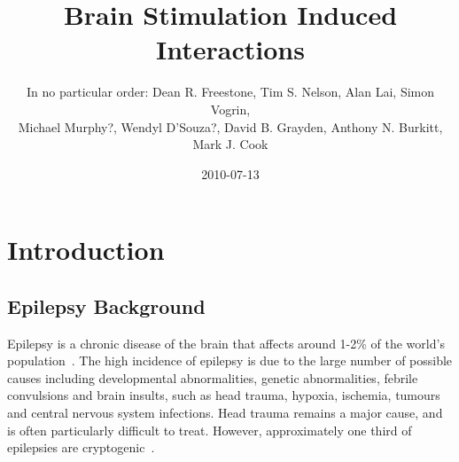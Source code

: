 \documentclass[]{article}
\title{Brain Stimulation Induced Interactions}
\author{In no particular order: Dean R. Freestone, Tim S. Nelson, Alan Lai, Simon Vogrin,\\
 Michael Murphy?, Wendyl D'Souza?, David B. Grayden, Anthony N. Burkitt, Mark J. Cook}
\date{2010-07-13}
\begin{document}
\ifpdf
{}
\else
{}
\fi

\maketitle


\begin{abstract}
\end{abstract}

\section{Introduction}
% 
% 

\subsection{Epilepsy Background}
Epilepsy is a chronic disease of the brain that affects around 1-2\% of the world’s population~\cite{Beran1985,Dua2006}. The high incidence of epilepsy is due to the large number of possible causes including developmental abnormalities, genetic abnormalities, febrile convulsions and brain insults, such as head trauma, hypoxia, ischemia, tumours and central nervous system infections. Head trauma remains a major cause, and is often particularly difficult to treat. However, approximately one third of epilepsies are cryptogenic~\cite{Theodore2006}.
\end{document}
